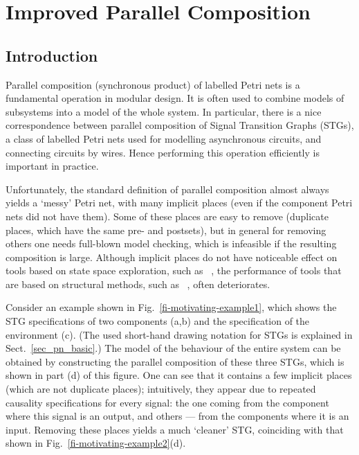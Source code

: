 \section{Improved Parallel Composition}\label{sec_intro}



\subsection{Introduction}

Parallel composition (\aka synchronous product) of labelled
Petri nets is a fundamental operation in modular design. It is
often used to combine models of subsystems into a model of the
whole system. In particular, there is a nice correspondence
between parallel composition of Signal Transition Graphs
(STGs), a class of labelled Petri nets used for modelling
asynchronous circuits, and connecting circuits by wires. Hence
performing this operation efficiently is important in practice.

Unfortunately, the standard definition of parallel composition almost always yields a `messy' Petri net, with many implicit places (even if the component Petri nets did not have them). Some of these places are easy to remove (\eg duplicate places, which have the same pre- and postsets), but in general for removing others one needs full-blown model checking, which is infeasible if the resulting composition is large.
Although implicit places do not have noticeable effect on tools based on state space exploration, such as \petrify~\cite{ckkly97}, the performance of tools that are based on structural methods, such as \desij~\cite{Sch07}, often deteriorates.

Consider an example shown in Fig.~\ref{fi-motivating-example1},
which shows the STG specifications of two components (a,b) and
the specification of the environment (c). (The used short-hand
drawing notation for STGs is explained in
Sect.~\ref{sec_pn_basic}.) The model of the behaviour of the
entire system can be obtained by constructing the parallel
composition of these three STGs, which is shown in part (d) of
this figure. One can see that it contains a few implicit places
(which are not duplicate places); intuitively, they appear due
to repeated causality specifications for every signal: the one
coming from the component where this signal is an output, and
others --- from the components where it is an input. Removing
these places yields a much `cleaner' STG, coinciding with that
shown in Fig.~\ref{fi-motivating-example2}(d).

